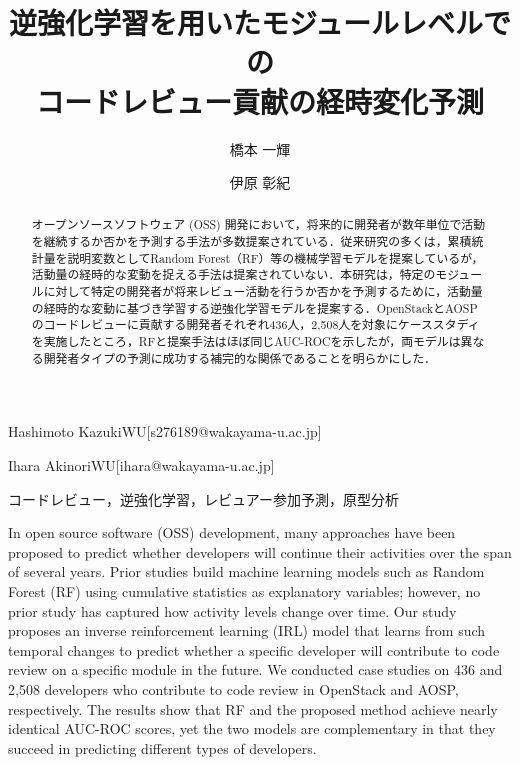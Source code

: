 \documentclass[submit]{ipsj}
\begin{document}
\title{逆強化学習を用いたモジュールレベルでの\\コードレビュー貢献の経時変化予測}




\author{橋本  一輝}{Hashimoto Kazuki}{WU}[s276189@wakayama-u.ac.jp]
\author{伊原  彰紀}{Ihara Akinori}{WU}[ihara@wakayama-u.ac.jp]

\begin{abstract}
オープンソースソフトウェア (OSS) 開発において，将来的に開発者が数年単位で活動を継続するか否かを予測する手法が多数提案されている．従来研究の多くは，累積統計量を説明変数としてRandom Forest（RF）等の機械学習モデルを提案しているが，活動量の経時的な変動を捉える手法は提案されていない．本研究は，特定のモジュールに対して特定の開発者が将来レビュー活動を行うか否かを予測するために，活動量の経時的な変動に基づき学習する逆強化学習モデルを提案する．OpenStackとAOSPのコードレビューに貢献する開発者それぞれ436人，2{,}508人を対象にケーススタディを実施したところ，RFと提案手法はほぼ同じAUC-ROCを示したが，両モデルは異なる開発者タイプの予測に成功する補完的な関係であることを明らかにした．
\end{abstract}


\begin{jkeyword}
コードレビュー，逆強化学習，レビュアー参加予測，原型分析

\end{jkeyword}

\begin{eabstract}
In open source software (OSS) development, many approaches have been proposed to predict whether developers will continue their activities over the span of several years. Prior studies build machine learning models such as Random Forest (RF) using cumulative statistics as explanatory variables; however, no prior study has captured how activity levels change over time. Our study proposes an inverse reinforcement learning (IRL) model that learns from such temporal changes to predict whether a specific developer will contribute to code review on a specific module in the future. We conducted case studies on 436 and 2,508 developers who contribute to code review in OpenStack and AOSP, respectively. The results show that RF and the proposed method achieve nearly identical AUC-ROC scores, yet the two models are complementary in that they succeed in predicting different types of developers.
\end{eabstract}
\end{document}
